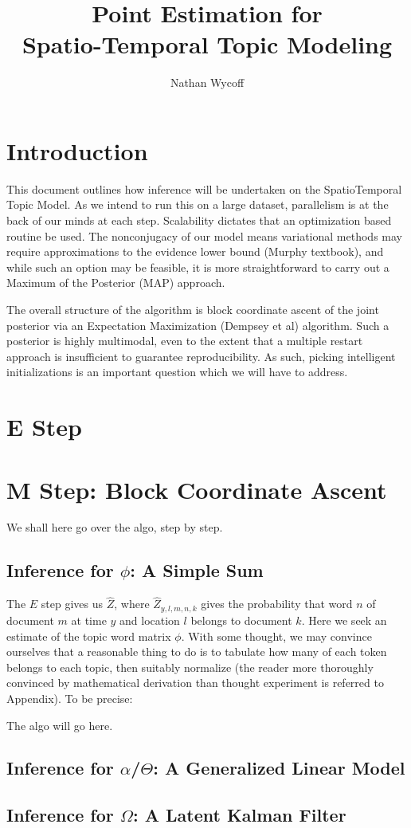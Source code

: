 \documentclass[a4paper]{article}
\title{Point Estimation for \\Spatio-Temporal Topic Modeling}
\author{Nathan Wycoff}
\begin{document}
\maketitle

\section{Introduction}

This document outlines how inference will be undertaken on the SpatioTemporal Topic Model. As we intend to run this on a large dataset, parallelism is at the back of our minds at each step. Scalability dictates that an optimization based routine be used. The nonconjugacy of our model means variational methods may require approximations to the evidence lower bound (Murphy textbook), and while such an option may be feasible, it is more straightforward to carry out a Maximum of the Posterior (MAP) approach.

The overall structure of the algorithm is block coordinate ascent of the joint posterior via an Expectation Maximization (Dempsey et al) algorithm. Such a posterior is highly multimodal, even to the extent that a multiple restart approach is insufficient to guarantee reproducibility. As such, picking intelligent initializations is an important question which we will have to address. 

\section{E Step}


\section{M Step: Block Coordinate Ascent}

We shall here go over the algo, step by step.

\subsection{Inference for $\phi$: A Simple Sum}

The $E$ step gives us $\hat{Z}$, where $\hat{Z}_{y,l,m,n,k}$ gives the probability that word $n$ of document $m$ at time $y$ and location $l$ belongs to document $k$. Here we seek an estimate of the topic word matrix $\phi$. With some thought, we may convince ourselves that a reasonable thing to do is to tabulate how many of each token belongs to each topic, then suitably normalize (the reader more thoroughly convinced by mathematical derivation than thought experiment is referred to Appendix). To be precise:

The algo will go here.

\subsection{Inference for $\alpha$/$\Theta$: A Generalized Linear Model}

\subsection{Inference for $\Omega$: A Latent Kalman Filter}
\end{document}
